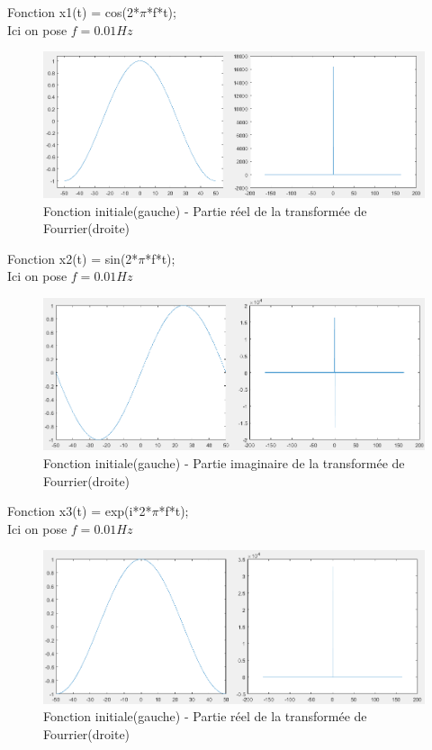 \documentclass[10pt,a4paper]{article}
\begin{document}
Fonction x1(t) = cos(2*$\pi$*f*t);\\
Ici on pose \(f = 0.01 Hz \)
\begin{figure}[h]
\begin{center}
\includegraphics[scale=0.7]{x1.png}
\caption{Fonction initiale(gauche) - Partie réel de la transformée de Fourrier(droite)}
\end{center}
\end{figure}

Fonction x2(t) = sin(2*$\pi$*f*t);\\
Ici on pose \(f = 0.01 Hz \)
\begin{figure}[h]
\begin{center}
\includegraphics[scale=0.7]{x2_imag.png}
\caption{Fonction initiale(gauche) - Partie imaginaire de la transformée de Fourrier(droite)}
\end{center}
\end{figure}

Fonction x3(t) = exp(i*2*$\pi$*f*t);\\
Ici on pose \(f = 0.01 Hz \)
\begin{figure}[h]
\begin{center}
\includegraphics[scale=0.7]{x3.png}
\caption{Fonction initiale(gauche) - Partie réel de la transformée de Fourrier(droite)}
\end{center}
\end{figure}
\end{document}

